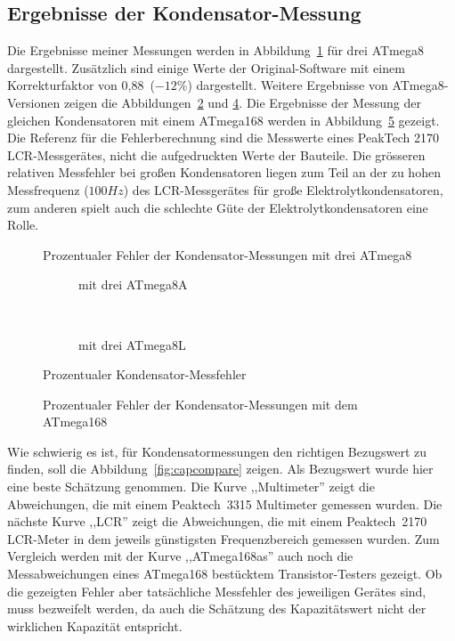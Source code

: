 \subsection{Ergebnisse der Kondensator-Messung}
Die Ergebnisse meiner Messungen werden in Abbildung~\ref{fig:mega8cap} für drei ATmega8 dargestellt.
Zusätzlich sind einige Werte der Original-Software mit einem Korrekturfaktor
von 0,88~(\(-12\%\)) dargestellt.
Weitere Ergebnisse von ATmega8-Versionen zeigen die Abbildungen~\ref{fig:mega8Acap} und \ref{fig:mega8Lcap}.
Die Ergebnisse der Messung der gleichen Kondensatoren mit einem ATmega168 werden in Abbildung~\ref{fig:mega168cap} gezeigt.
Die Referenz für die Fehlerberechnung sind die Messwerte eines PeakTech 2170 LCR-Messgerätes, 
 nicht die aufgedruckten Werte der Bauteile.
Die grösseren relativen Messfehler bei großen Kondensatoren liegen zum Teil an der zu hohen Messfrequenz (\(100Hz\)) des
LCR-Messgerätes für große Elektrolytkondensatoren, zum anderen spielt auch die schlechte Güte der
Elektrolytkondensatoren eine Rolle.

\begin{figure}[H]
\centering

\caption{Prozentualer Fehler der Kondensator-Messungen mit drei ATmega8}
\label{fig:mega8cap}
\end{figure}

\begin{figure}[H]
  \begin{subfigure}[b]{9cm}
    \centering
    \resizebox{9cm}{!}{}
    \caption{mit drei ATmega8A}
    \label{fig:mega8Acap}
  \end{subfigure}
  ~
  \begin{subfigure}[b]{9cm}
    \centering
    \resizebox{9cm}{!}{}
    \caption{mit drei ATmega8L}
    \label{fig:mega8Lcap}
  \end{subfigure}
  \caption{Prozentualer Kondensator-Messfehler}
\end{figure}

\begin{figure}[H]
\centering

\caption{Prozentualer Fehler der Kondensator-Messungen mit dem ATmega168}
\label{fig:mega168cap}
\end{figure}

Wie schwierig es ist, für Kondensatormessungen den richtigen Bezugswert zu finden, soll die Abbildung~\ref{fig:capcompare} zeigen.
Als Bezugswert wurde hier eine beste Schätzung genommen. Die Kurve ,,Multimeter'' zeigt die Abweichungen, die mit einem
Peaktech~3315 Multimeter gemessen wurden.
Die nächste Kurve ,,LCR'' zeigt die Abweichungen, die mit einem Peaktech~2170 LCR-Meter in dem jeweils günstigsten Frequenzbereich gemessen wurden.
Zum Vergleich werden mit der Kurve ,,ATmega168as'' auch noch die Messabweichungen eines ATmega168 bestücktem Transistor-Testers gezeigt.
Ob die gezeigten Fehler aber tatsächliche Messfehler des jeweiligen Gerätes sind, muss bezweifelt werden, da auch die
Schätzung des Kapazitätswert nicht der wirklichen Kapazität entspricht.

